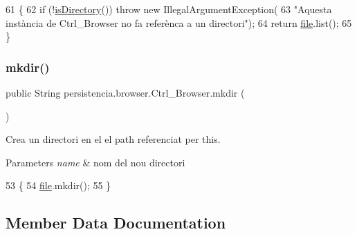 \begin{DoxyCode}
61                            \{
62         \textcolor{keywordflow}{if} (!\hyperlink{classpersistencia_1_1browser_1_1Ctrl__Browser_abdf13ea9a8d928b1efc6f3a69e18f6c6}{isDirectory}()) \textcolor{keywordflow}{throw} \textcolor{keyword}{new} IllegalArgumentException(
63             \textcolor{stringliteral}{"Aquesta instància de Ctrl\_Browser no fa referènca a un directori"});
64         \textcolor{keywordflow}{return} \hyperlink{classpersistencia_1_1browser_1_1Ctrl__Browser_a72c151aed575c0848f7dbb1609b373c8}{file}.list();
65     \}
\end{DoxyCode}
\mbox{\label{classpersistencia_1_1browser_1_1Ctrl__Browser_a947773ee38a780bae338aa0e4f396f6f}} 
\subsubsection{\texorpdfstring{mkdir()}{mkdir()}}
{\footnotesize\ttfamily public String persistencia.\+browser.\+Ctrl\+\_\+\+Browser.\+mkdir (\begin{DoxyParamCaption}{ }\end{DoxyParamCaption})\hspace{0.3cm}{\ttfamily [inline]}}



Crea un directori en el el path referenciat per this. 


\begin{DoxyParams}{Parameters}
{\em name} & nom del nou directori \\
\hline
\end{DoxyParams}

\begin{DoxyCode}
53                         \{
54         \hyperlink{classpersistencia_1_1browser_1_1Ctrl__Browser_a72c151aed575c0848f7dbb1609b373c8}{file}.mkdir();
55     \}
\end{DoxyCode}


\subsection{Member Data Documentation}
\mbox{\label{classpersistencia_1_1browser_1_1Ctrl__Browser_a72c151aed575c0848f7dbb1609b373c8}} 
